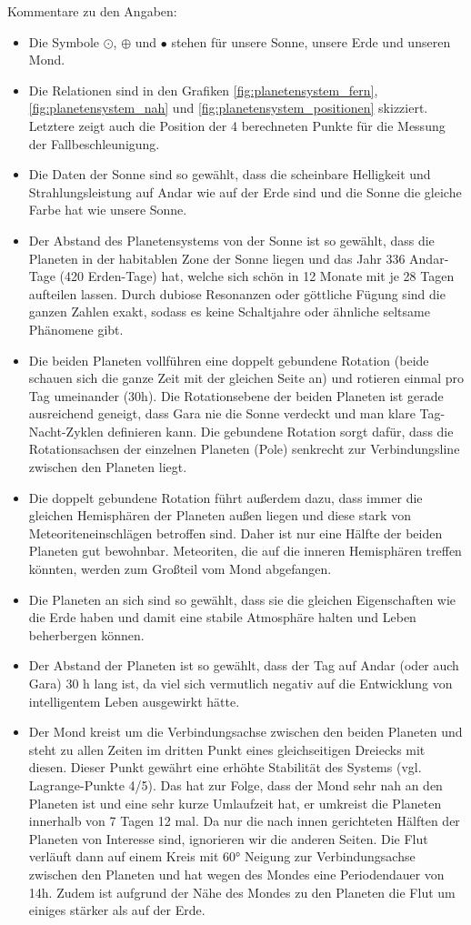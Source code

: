 Kommentare zu den Angaben:
\begin{itemize}
	\item Die Symbole $\odot$, $\oplus$ und $\bullet$ stehen für unsere Sonne, unsere Erde und unseren Mond.
	\item Die Relationen sind in den Grafiken \ref{fig:planetensystem_fern}, \ref{fig:planetensystem_nah} und \ref{fig:planetensystem_positionen} skizziert. Letztere zeigt auch die Position der 4 berechneten Punkte für die Messung der Fallbeschleunigung.
	\item Die Daten der Sonne sind so gewählt, dass die scheinbare Helligkeit und Strahlungsleistung auf Andar wie auf der Erde sind und die Sonne die gleiche Farbe hat wie unsere Sonne.
	\item Der Abstand des Planetensystems von der Sonne ist so gewählt, dass die Planeten in der habitablen Zone der Sonne liegen und das Jahr 336 Andar-Tage (420 Erden-Tage) hat, welche sich schön in 12 Monate mit je 28 Tagen aufteilen lassen. Durch dubiose Resonanzen oder göttliche Fügung sind die ganzen Zahlen exakt, sodass es keine Schaltjahre oder ähnliche seltsame Phänomene gibt.
	\item Die beiden Planeten vollführen eine doppelt gebundene Rotation (beide schauen sich die ganze Zeit mit der gleichen Seite an) und rotieren einmal pro Tag umeinander (30h). Die Rotationsebene der beiden Planeten ist gerade ausreichend geneigt, dass Gara nie die Sonne verdeckt und man klare Tag-Nacht-Zyklen definieren kann. Die gebundene Rotation sorgt dafür, dass die Rotationsachsen der einzelnen Planeten (Pole) senkrecht zur Verbindungsline zwischen den Planeten liegt.
	\item Die doppelt gebundene Rotation führt außerdem dazu, dass immer die gleichen Hemisphären der Planeten außen liegen und diese stark von Meteoriteneinschlägen betroffen sind. Daher ist nur eine Hälfte der beiden Planeten gut bewohnbar. Meteoriten, die auf die inneren Hemisphären treffen könnten, werden zum Großteil vom Mond abgefangen.
	\item Die Planeten an sich sind so gewählt, dass sie die gleichen Eigenschaften wie die Erde haben und damit eine stabile Atmosphäre halten und Leben beherbergen können.
	\item Der Abstand der Planeten ist so gewählt, dass der Tag auf Andar (oder auch Gara) 30 h lang ist, da viel sich vermutlich negativ auf die Entwicklung von intelligentem Leben ausgewirkt hätte.
	\item Der Mond kreist um die Verbindungsachse zwischen den beiden Planeten und steht zu allen Zeiten im dritten Punkt eines gleichseitigen Dreiecks mit diesen. Dieser Punkt gewährt eine erhöhte Stabilität des Systems (vgl. Lagrange-Punkte 4/5). Das hat zur Folge, dass der Mond sehr nah an den Planeten ist und eine sehr kurze Umlaufzeit hat, er umkreist die Planeten innerhalb von 7 Tagen 12 mal. Da nur die nach innen gerichteten Hälften der Planeten von Interesse sind, ignorieren wir die anderen Seiten. Die Flut verläuft dann auf einem Kreis mit 60° Neigung zur Verbindungsachse zwischen den Planeten und hat wegen des Mondes eine Periodendauer von 14h. Zudem ist aufgrund der Nähe des Mondes zu den Planeten die Flut um einiges stärker als auf der Erde.

\end{itemize}
